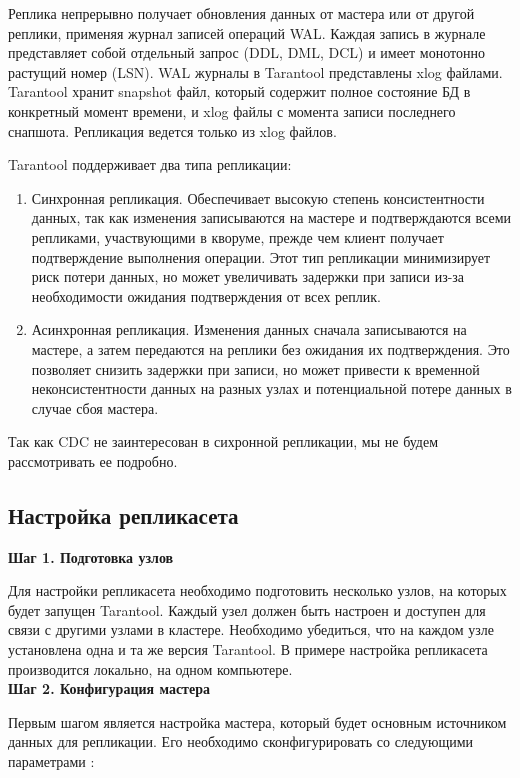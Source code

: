 Реплика непрерывно получает обновления данных от мастера или от другой реплики, применяя журнал записей операций WAL. Каждая запись в журнале представляет собой отдельный запрос (DDL, DML, DCL) и имеет монотонно растущий номер (LSN). WAL журналы в Tarantool представлены xlog файлами. Tarantool хранит snapshot файл, который содержит полное состояние БД в конкретный момент времени, и xlog файлы с момента записи последнего снапшота. Репликация ведется только из xlog файлов.

Tarantool поддерживает два типа репликации:

\begin{enumerate}
    \item Синхронная репликация. Обеспечивает высокую степень консистентности данных, так как изменения записываются на мастере и подтверждаются всеми репликами, участвующими в кворуме, прежде чем клиент получает подтверждение выполнения операции. Этот тип репликации минимизирует риск потери данных, но может увеличивать задержки при записи из-за необходимости ожидания подтверждения от всех реплик.
    \item Асинхронная репликация. Изменения данных сначала записываются на мастере, а затем передаются на реплики без ожидания их подтверждения. Это позволяет снизить задержки при записи, но может привести к временной неконсистентности данных на разных узлах и потенциальной потере данных в случае сбоя мастера.
\end{enumerate}

Так как CDC не заинтересован в сихронной репликации, мы не будем рассмотривать ее подробно.


\subsection{Настройка репликасета}

\textbf{Шаг 1. Подготовка узлов}

Для настройки репликасета необходимо подготовить несколько узлов, на которых будет запущен Tarantool. Каждый узел должен быть настроен и доступен для связи с другими узлами в кластере. Необходимо убедиться, что на каждом узле установлена одна и та же версия Tarantool. В примере настройка репликасета производится локально, на одном компьютере. \\

\textbf{Шаг 2. Конфигурация мастера}

Первым шагом является настройка мастера, который будет основным источником данных для репликации. Его необходимо сконфигурировать со следующими параметрами \cite{TarantoolDoc}:


